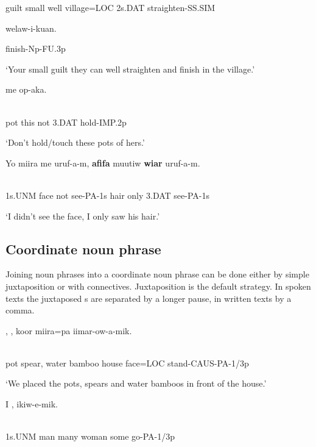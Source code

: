 guilt  small  well  village=LOC  2s.DAT  straighten-SS.SIM  

welaw-i-kuan.

finish-Np-FU.3p

`Your small guilt they can well straighten and finish in the village.'

\ea%
\label{ex:x1812}
\gll {}  me    op-aka. \\
      \\
\glt
\z

pot  this  not  3.DAT  hold-IMP.2p

`Don't hold/touch these pots of hers.'

\ea%
\label{ex:x1938}
\gll Yo  miira  me  uruf-a-m,  \textbf{afifa}  muutiw  \textbf{wiar}  uruf-a-m. \\
      \\
\glt
\z

1s.UNM  face  not  see-PA-1s  hair  only  3.DAT  see-PA-1s

`I didn't see the face, I only saw his hair.'

\subsection{Coordinate noun phrase}
\hypertarget{RefHeading21681935131865}{}
Joining noun phrases into a coordinate noun phrase can be done either by simple juxtaposition or with connectives. Juxtaposition is the default strategy.  In spoken texts the juxtaposed s are separated by a longer pause, in written texts by a comma.

\ea%
\label{ex:x810}
\gll {},  ,    koor  miira=pa  iimar-ow-a-mik. \\
      \\
\glt
\z

pot  spear,  water  bamboo  house  face=LOC  stand-CAUS-PA-1/3p

`We placed the pots, spears and water bamboos in front of the house.'

\ea%
\label{ex:x811}
\gll I  ,    ikiw-e-mik. \\
      \\
\glt
\z

1s.UNM  man  many  woman  some  go-PA-1/3p

